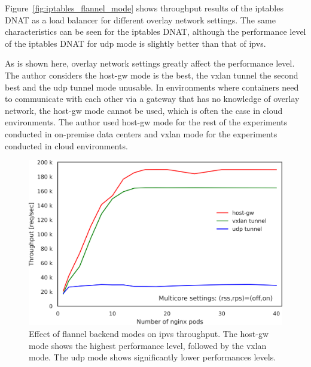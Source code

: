 Figure~\ref{fig:iptables_flannel_mode} shows throughput results of the iptables DNAT as a load balancer for different overlay network settings.
The same characteristics can be seen for the iptables DNAT, although the performance level of the iptables DNAT for udp mode is slightly better than that of ipvs.

As is shown here, overlay network settings greatly affect the performance level.
The author considers the host-gw mode is the best, the vxlan tunnel the second best and the udp tunnel mode unusable.
In environments where containers need to communicate with each other via a gateway that has no knowledge of overlay network, the host-gw mode cannot be used, which is often the case in cloud environments. 
The author used host-gw mode for the rest of the experiments conducted in on-premise data centers and vxlan mode for the experiments conducted in cloud environments.

\begin{figure}[h]
  \centering
  \includegraphics[width=0.75\columnwidth]{Figs/ipvs_flannel_mode}

  \par\bigskip
  \centering
  \begin{minipage}{0.9\columnwidth}
    \caption[Effect of flannel backend modes on ipvs throughput]{
      Effect of flannel backend modes on ipvs throughput.
      The host-gw mode shows the highest performance level, followed by the vxlan mode.
      The udp mode shows significantly lower performances levels.
    }
    \label{fig:ipvs_flannel_mode}
  \end{minipage}
\end{figure}

